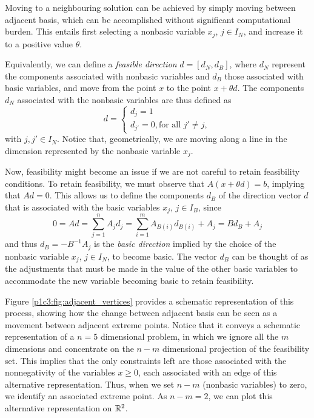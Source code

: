 Moving to a neighbouring solution can be achieved by simply moving between adjacent basis, which can be accomplished without significant computational burden. This entails first selecting a nonbasic variable $x_j$, $j \in I_N$, and increase it to a positive value $\theta$. 

Equivalently, we can define a \emph{feasible direction} $d = [d_N, d_B]$, where $d_N$ represent the components associated with nonbasic variables and $d_B$ those associated with basic variables, and move from the point $x$ to the point $x + \theta d$. The components $d_N$ associated with the nonbasic variables are thus defined as 
%
\begin{equation*}
d = \begin{cases} d_j = 1 \\ 
				  d_{j'} = 0, \text{for all } j' \neq j, 
	\end{cases}	
\end{equation*}
%
with $j, j' \in I_N$. Notice that, geometrically, we are moving along a line in the dimension represented by the nonbasic variable $x_j$.

Now, feasibility might become an issue if we are not careful to retain feasibility conditions. To retain feasibility, we must observe that $A(x + \theta d) = b$, implying that $Ad = 0$. This allows us to define the components $d_B$ of the direction vector $d$ that is associated with the basic variables $x_j$, $j \in I_B$, since
%
\begin{equation*}
	0 = Ad = \sum_{j = 1}^n	A_j d_j = \sum_{i = 1}^m A_{B(i)}d_{B(i)} + A_j = Bd_B + A_j
\end{equation*}
%
and thus $d_B = -B^{-1} A_j$ is the \emph{basic direction} implied by the choice of the nonbasic variable $x_j$, $j \in I_N$, to become basic. The vector $d_B$ can be thought of as the adjustments that must be made in the value of the other basic variables to accommodate the new variable becoming basic to retain feasibility. 


Figure \ref{p1c3:fig:adjacent_vertices} provides a schematic representation of this process, showing how the change between adjacent basis can be seen as a movement between adjacent extreme points. Notice that it conveys a schematic representation of a $n=5$ dimensional problem, in which we ignore all the $m$ dimensions and concentrate on the $n-m$ dimensional projection of the feasibility set. This implies that the only constraints left are those associated with the nonnegativity of the variables $x \ge 0$, each associated with an edge of this alternative representation. Thus, when we set $n-m$ (nonbasic variables) to zero, we identify an associated extreme point. As $n-m = 2$, we can plot this alternative representation on $\mathbb{R}^2$.

